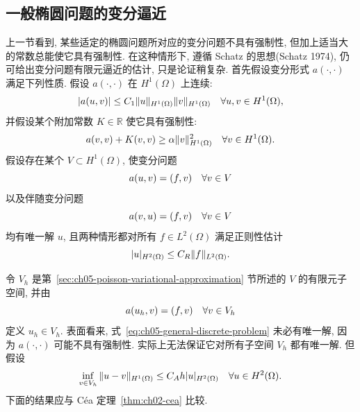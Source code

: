 \subsection{一般椭圆问题的变分逼近}
\label{sec:ch05-general-elliptic-variational-approximation}
\setcounter{thmcount}{0}
\setcounter{equation}{0}

上一节看到, 某些适定的椭圆问题所对应的变分问题不具有强制性, 但加上适当大的常数总能使它具有强制性. 在这种情形下, 遵循 Schatz 的思想(Schatz 1974), 仍可给出变分问题有限元逼近的估计, 只是论证稍复杂. 首先假设变分形式 $a(\cdot,\cdot)$ 满足下列性质. 假设 $a(\cdot,\cdot)$ 在 $H^1(\Omega)$ 上连续:
\begin{equation}
\MathBookFormulaID{formula-ch05-general-form-continuity}
\label{eq:ch05-general-form-continuity}
|a(u,v)|\leq C_1\|u\|_{H^1(\Omega)}\|v\|_{H^1(\Omega)}
\quad\forall u,v\in H^1(\Omega),
\end{equation}
并假设某个附加常数 $K\in\mathbb R$ 使它具有强制性:
\begin{equation}
\MathBookFormulaID{formula-ch05-shifted-coercivity}
\label{eq:ch05-shifted-coercivity}
a(v,v)+K(v,v)\geq\alpha\|v\|_{H^1(\Omega)}^2
\quad\forall v\in H^1(\Omega).
\end{equation}
假设存在某个 $V\subset H^1(\Omega)$, 使变分问题
\[
\MathBookFormulaID{formula-ch05-general-continuous-primal-problem}
a(u,v)=(f,v)\quad\forall v\in V
\]
以及伴随变分问题
\[
\MathBookFormulaID{formula-ch05-general-continuous-adjoint-problem}
a(v,u)=(f,v)\quad\forall v\in V
\]
均有唯一解 $u$, 且两种情形都对所有 $f\in L^2(\Omega)$ 满足正则性估计
\begin{equation}
\MathBookFormulaID{formula-ch05-general-h2-regularity}
\label{eq:ch05-general-h2-regularity}
|u|_{H^2(\Omega)}\leq C_R\|f\|_{L^2(\Omega)}.
\end{equation}

令 $V_h$ 是第~\ref{sec:ch05-poisson-variational-approximation} 节所述的 $V$ 的有限元子空间, 并由
\begin{equation}
\MathBookFormulaID{formula-ch05-general-discrete-problem}
\label{eq:ch05-general-discrete-problem}
a(u_h,v)=(f,v)\quad\forall v\in V_h
\end{equation}
定义 $u_h\in V_h$. 表面看来, 式~\eqref{eq:ch05-general-discrete-problem} 未必有唯一解, 因为 $a(\cdot,\cdot)$ 可能不具有强制性. 实际上无法保证它对所有子空间 $V_h$ 都有唯一解. 但假设
\begin{equation}
\MathBookFormulaID{formula-ch05-general-approximation-property}
\label{eq:ch05-general-approximation-property}
\inf_{v\in V_h}\|u-v\|_{H^1(\Omega)}
\leq C_Ah|u|_{H^2(\Omega)}
\quad\forall u\in H^2(\Omega).
\end{equation}
下面的结果应与 Céa 定理~\ref{thm:ch02-cea} 比较.

